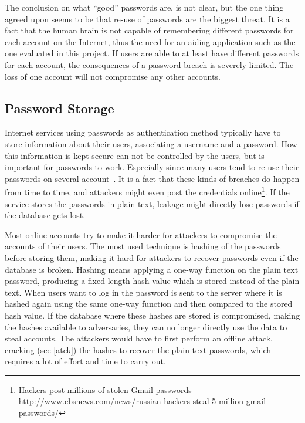 \par The conclusion on what ``good'' passwords are, is not clear, but the one thing agreed upon seems to be that re-use of passwords are the biggest threat. It is a fact that the human brain is not capable of remembering different passwords for each account on the Internet, thus the need for an aiding application such as the one evaluated in this project. If users are able to at least have different passwords for each account, the consequences of a password breach is severely limited. The loss of one account will not compromise any other accounts. 

\subsection{Password Storage}\label{pw-storage}
Internet services using passwords as authentication method typically have to store information about their users, associating a username and a password. How this information is kept secure can not be controlled by the users, but is important for passwords to work. Especially since many users tend to re-use their passwords on several account~\cite{domino-effect}. It is a fact that these kinds of breaches do happen from time to time, and attackers might even post the credentials online\footnote{Hackers post millions of stolen Gmail passwords - \url{http://www.cbsnews.com/news/russian-hackers-steal-5-million-gmail-passwords/} }. If the service stores the passwords in plain text, leakage might directly lose passwords if the database gets lost.
\par Most online accounts try to make it harder for attackers to compromise the accounts of their users. The most used technique is hashing of the passwords before storing them, making it hard for attackers to recover passwords even if the database is broken. Hashing means applying a one-way function on the plain text password, producing a fixed length hash value which is stored instead of the plain text. When users want to log in the password is sent to the server where it is hashed again using the same one-way function and then compared to the stored hash value. If the database where these hashes are stored is compromised, making the hashes available to adversaries, they can no longer directly use the data to steal accounts. The attackers would have to first perform an offline attack, cracking (see \autoref{atck}) the hashes to recover the plain text passwords, which requires a lot of effort and time to carry out. 
